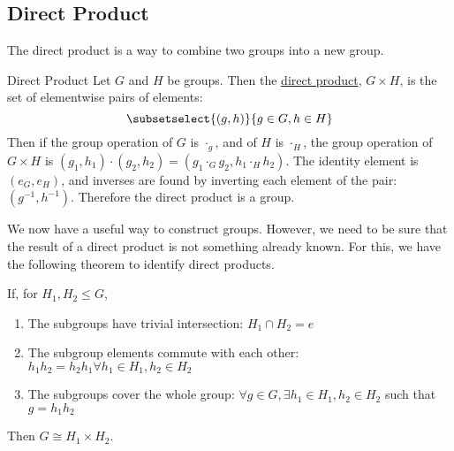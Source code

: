 \documentclass[../Main.tex]{subfiles}
\begin{document}
\subsection{Direct Product}
The direct product is a way to combine two groups into a new group.
\begin{definition}{Direct Product}
    Let $G$ and $H$ be groups. Then the \underline{direct product}, $G \times H$, is the set of elementwise pairs of elements:
    \begin{equation*}
        \subsetselect{(g, h)}{g \in G, h \in H}
    \end{equation*}
    Then if the group operation of $G$ is $\cdot_g$, and of $H$ is $\cdot_H$, the group operation of $G \times H$ is $(g_1, h_1) \cdot (g_2, h_2) = (g_1 \cdot_G g_2, h_1 \cdot_H h_2)$.
    The identity element is $(e_G, e_H)$, and inverses are found by inverting each element of the pair: $(g^{-1}, h^{-1})$.
    Therefore the direct product is a group.
\end{definition}
We now have a useful way to construct groups. However, we need to be sure that the result of a direct product is not something already known. For this, we have the following theorem to identify direct products.
\begin{theorem}
    If, for $H_1, H_2 \leq G$,
    \begin{enumerate}
        \item The subgroups have trivial intersection: $H_1 \cap H_2 = {e}$
        \item The subgroup elements commute with each other: $h_1 h_2 = h_2 h_1 \forall h_1 \in H_1, h_2 \in H_2$
        \item The subgroups cover the whole group: $\forall g \in G, \exists h_1 \in H_1, h_2 \in H_2$ such that $g = h_1 h_2$
    \end{enumerate}
    Then $G \cong H_1 \times H_2$.
    \label{thmDirectProduct}
\end{theorem}
\end{document}

